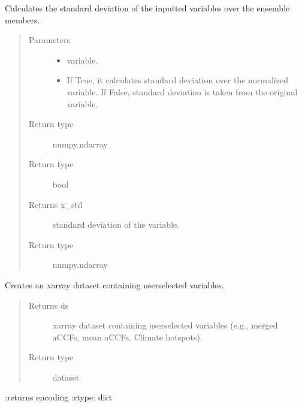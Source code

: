 \documentclass[a4paper,11pt,english]{sphinxmanual}
\begin{document}
\begin{fulllineitems}
\begin{fulllineitems}
\label{\detokenize{modules:envlib.accf.GeTaCCFs.get_std}}
Calculates the standard deviation of the inputted variables over the ensemble members.
\begin{quote}\begin{description}
\item[{Parameters}] \leavevmode\begin{itemize}
\item {} 
 \textendash{} variable.

\item {} 
 \textendash{} If True, it calculates standard deviation over the normalized variable. If False, standard deviation is taken from the original variable.

\end{itemize}

\item[{Return type}] \leavevmode
numpy.ndarray

\item[{Return type}] \leavevmode
bool

\item[{Returns x\_std}] \leavevmode
standard deviation of the variable.

\item[{Return type}] \leavevmode
numpy.ndarray

\end{description}\end{quote}

\end{fulllineitems}


\begin{fulllineitems}
\label{\detokenize{modules:envlib.accf.GeTaCCFs.get_xarray}}
Creates an xarray dataset containing user\sphinxhyphen{}selected variables.
\begin{quote}\begin{description}
\item[{Returns ds}] \leavevmode
xarray dataset containing user\sphinxhyphen{}selected variables (e.g., merged aCCFs, mean aCCFs, Climate hotspots).

\item[{Return type}] \leavevmode
dataset

\end{description}\end{quote}

:returns encoding
:rtype: dict

\end{fulllineitems}


\end{fulllineitems}
\end{document}
